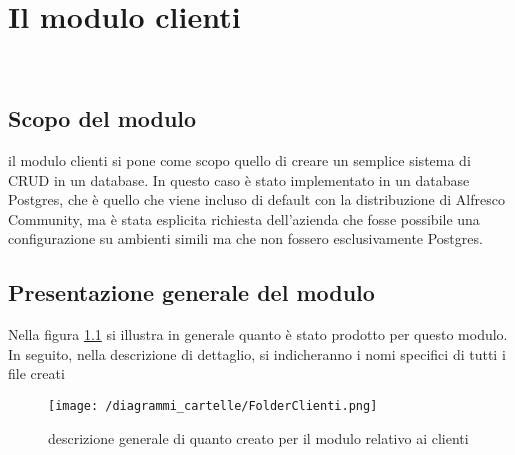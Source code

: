 %
%
%
%
%
%
%
%
%
%
%
%
%
\chapter{Il modulo clienti}
\label{cap:modulo-clienti}

\\

\section{Scopo del modulo} il modulo clienti si pone come scopo quello di creare un semplice sistema di CRUD in un database. In questo caso è stato implementato in un database Postgres, che è quello che viene incluso di default con la distribuzione di Alfresco Community, ma è stata esplicita richiesta dell'azienda che fosse possibile una configurazione su ambienti simili ma che non fossero esclusivamente Postgres.
\section{Presentazione generale del modulo}
Nella figura \ref{fig:cartelle-clienti} si illustra in generale quanto è stato prodotto per questo modulo. In seguito, nella descrizione di dettaglio, si indicheranno i nomi specifici di tutti i file creati
\begin{figure}[!ht]
\centering
\texttt{[image: /diagrammi\_cartelle/FolderClienti.png]}
\caption{descrizione generale di quanto creato per il modulo relativo ai clienti\label{fig:cartelle-clienti}}
\end{figure}
